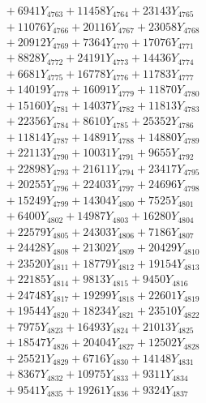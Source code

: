\documentclass[a4paper,10pt]{article}
\begin{document}
{\begin{align}
&\;  + 6941 Y_{4763} + 11458 Y_{4764} + 23143 Y_{4765} \\[0.3ex]
&\;  + 11076 Y_{4766} + 20116 Y_{4767} + 23058 Y_{4768} \\[0.5ex]\allowbreak
&\;  + 20912 Y_{4769} + 7364 Y_{4770} + 17076 Y_{4771} \\[0.3ex]
&\;  + 8828 Y_{4772} + 24191 Y_{4773} + 14436 Y_{4774} \\[0.3ex]
&\;  + 6681 Y_{4775} + 16778 Y_{4776} + 11783 Y_{4777} \\[0.3ex]
&\;  + 14019 Y_{4778} + 16091 Y_{4779} + 11870 Y_{4780} \\[0.3ex]
&\;  + 15160 Y_{4781} + 14037 Y_{4782} + 11813 Y_{4783} \\[0.3ex]
&\;  + 22356 Y_{4784} + 8610 Y_{4785} + 25352 Y_{4786} \\[0.3ex]
&\;  + 11814 Y_{4787} + 14891 Y_{4788} + 14880 Y_{4789} \\[0.3ex]
&\;  + 22113 Y_{4790} + 10031 Y_{4791} + 9655 Y_{4792} \\[0.3ex]
&\;  + 22898 Y_{4793} + 21611 Y_{4794} + 23417 Y_{4795} \\[0.3ex]
&\;  + 20255 Y_{4796} + 22403 Y_{4797} + 24696 Y_{4798} \\[0.5ex]\allowbreak
&\;  + 15249 Y_{4799} + 14304 Y_{4800} + 7525 Y_{4801} \\[0.3ex]
&\;  + 6400 Y_{4802} + 14987 Y_{4803} + 16280 Y_{4804} \\[0.3ex]
&\;  + 22579 Y_{4805} + 24303 Y_{4806} + 7186 Y_{4807} \\[0.3ex]
&\;  + 24428 Y_{4808} + 21302 Y_{4809} + 20429 Y_{4810} \\[0.3ex]
&\;  + 23520 Y_{4811} + 18779 Y_{4812} + 19154 Y_{4813} \\[0.3ex]
&\;  + 22185 Y_{4814} + 9813 Y_{4815} + 9450 Y_{4816} \\[0.3ex]
&\;  + 24748 Y_{4817} + 19299 Y_{4818} + 22601 Y_{4819} \\[0.3ex]
&\;  + 19544 Y_{4820} + 18234 Y_{4821} + 23510 Y_{4822} \\[0.3ex]
&\;  + 7975 Y_{4823} + 16493 Y_{4824} + 21013 Y_{4825} \\[0.3ex]
&\;  + 18547 Y_{4826} + 20404 Y_{4827} + 12502 Y_{4828} \\[0.5ex]\allowbreak
&\;  + 25521 Y_{4829} + 6716 Y_{4830} + 14148 Y_{4831} \\[0.3ex]
&\;  + 8367 Y_{4832} + 10975 Y_{4833} + 9311 Y_{4834} \\[0.3ex]
&\;  + 9541 Y_{4835} + 19261 Y_{4836} + 9324 Y_{4837} \\[0.3ex]

\end{align}}
\end{document}
